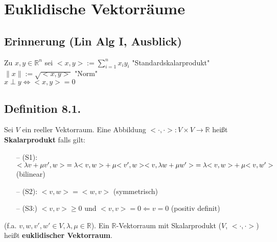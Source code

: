 \documentclass[a4paper, 12pt]{extarticle}
\begin{document}
\section{Euklidische Vektorräume}
\subsection*{Erinnerung (Lin Alg I, Ausblick)}
Zu $x, y \in \mathbb{R}^n$ sei ${<x, y>} := \sum_{i=1}^{n}x_iy_i$ "Standardskalarprodukt"\\
$\parallel x\parallel := \sqrt{<x, y>}$ "Norm"\\
$x \perp y \Leftrightarrow {<x, y>} = 0$

\subsection*{Definition 8.1.}
Sei $V$ ein reeller Vektorraum. Eine Abbildung $<\cdot, \cdot>: V \times V \longrightarrow \mathbb{R}$ heißt \textbf{Skalarprodukt} falls gilt:
\begin{enumerate}
	\item [--] (S1): ${<\lambda v + \mu v', w>} = \lambda {<v, w>} + \mu {<v', w>}\\
	{<v, \lambda w + \mu w'>} = \lambda {<v, w>} + \mu {<v, w'>}$ (bilinear)
	\item [--] (S2): ${<v, w>} = {<w, v>}$ (symmetrisch)
	\item[--] (S3:) ${<v, v>} \geq 0$ und ${<v, v>} = 0 \Leftarrow v = 0$ (positiv definit)
\end{enumerate}

(f.a. $v, w, v', w' \in V, \lambda, \mu \in \mathbb{R}$).
Ein $\mathbb{R}$-Vektorraum mit Skalarprodukt ($V$, ${<\cdot, \cdot>}$) heißt \textbf{euklidischer Vektorraum}.
\end{document}
